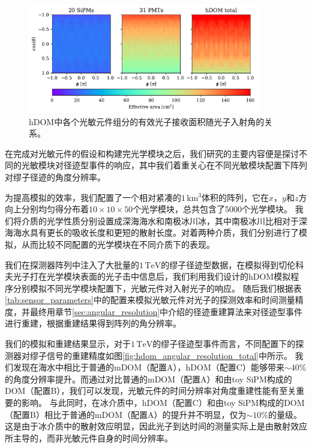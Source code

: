 \begin{figure}[!htb]%
    \centering
    \includegraphics[width=0.90\textwidth]{img/hdom_effective_area.pdf}
    \caption{hDOM中各个光敏元件组分的有效光子接收面积随光子入射角的关系。}
    \label{fig:hdom_effective_area}
\end{figure}

在完成对光敏元件的假设和构建完光学模块之后，我们研究的主要内容便是探讨不同的光敏模块对径迹型事件的响应，其中我们着重关心在不同光敏模块配置下阵列对缪子径迹的角度分辨率。

为提高模拟的效率，我们配置了一个相对紧凑的$1\,\mathrm{km^3}$体积的阵列，它在$x$，$y$和$z$方向上分别均匀得分布着$10 \times 10 \times 50$个光学模块，总共包含了5000个光学模块。
我们将介质的光学性质分别设置成深海海水和南极冰川冰，其中南极冰川比相对于深海海水具有更长的吸收长度和更短的散射长度\cite{OP_IceCube:2013, OP_KM3NeT_LAMS:2011}。对着两种介质，我们分别进行了模拟，从而比较不同配置的光学模块在不同介质下的表现。

我们在探测器阵列中注入了大批量的$1\,\mathrm{TeV}$的缪子径迹型数据，在模拟得到切伦科夫光子打在光学模块表面的光子击中信息后，我们利用我们设计的hDOM模拟程序分别模拟不同光学模块配置下，光敏元件对入射光子的响应。
随后我们根据表\ref{tab:sensor_parameters}中的配置来模拟光敏元件对光子的探测效率和时间测量精度，并最终用章节\ref{sec:angular_resolution}中介绍的径迹重建算法来对径迹型事件进行重建，根据重建结果得到阵列的角分辨率。

我们的模拟和重建结果显示，对于$1\,\mathrm{TeV}$的缪子径迹型事件而言，不同配置下的探测器对缪子信号的重建精度如图\ref{fig:hdom_angular_resolution_total}中所示。
我们发现在海水中相比于普通的mDOM（配置A），hDOM（配置C）能够带来$\sim40\%$的角度分辨率提升。而通过对比普通的mDOM（配置A）和由toy SiPM构成的DOM（配置B），我们可以发现，光敏元件的时间分辨率对角度重建性能有至关重要的影响。
与此同时，在冰介质中，hDOM（配置C）和由toy SiPM构成的DOM（配置B）相比于普通的mDOM（配置A）的提升并不明显，仅为$\sim 10\%$的量级。这是由于冰介质中的散射效应明显，因此光子到达时间的测量实际上是由散射效应所主导的，而非光敏元件自身的时间分辨率。

